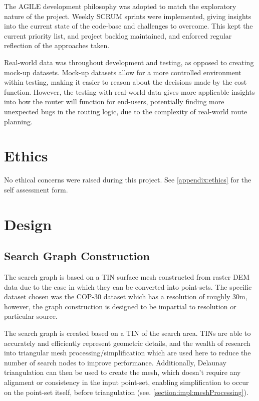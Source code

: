 \documentclass[12pt]{article}
\begin{document}
The AGILE development philosophy was adopted to match the exploratory nature of the project. Weekly SCRUM sprints were implemented, giving insights into the current state of the code-base and challenges to overcome. This kept the current priority list, and project backlog maintained, and enforced regular reflection of the approaches taken.

Real-world data was throughout development and testing, as opposed to creating mock-up datasets. Mock-up datasets allow for a more controlled environment within testing, making it easier to reason about the decisions made by the cost function. However, the testing with real-world data gives more applicable insights into how the router will function for end-users, potentially finding more unexpected bugs in the routing logic, due to the complexity of real-world route planning.

\section{Ethics}

No ethical concerns were raised during this project. See \autoref{appendix:ethics} for the self assessment form.

\section{Design}

\subsection{Search Graph Construction}

The search graph is based on a TIN surface mesh constructed from raster DEM data due to the ease in which they can be converted into point-sets. The specific dataset chosen was the COP-30 dataset which has a resolution of roughly 30m, however, the graph construction is designed to be impartial to resolution or particular source.

The search graph is created based on a TIN of the search area. TINs are able to accurately and efficiently represent geometric details, and the wealth of research into triangular mesh processing/simplification which are used here to reduce the number of search nodes to improve performance. Additionally, Delaunay triangulation can then be used to create the mesh, which doesn't require any alignment or consistency in the input point-set, enabling simplification to occur on the point-set itself, before triangulation (see. \autoref{section:impl:meshProcessing}).
\end{document}
